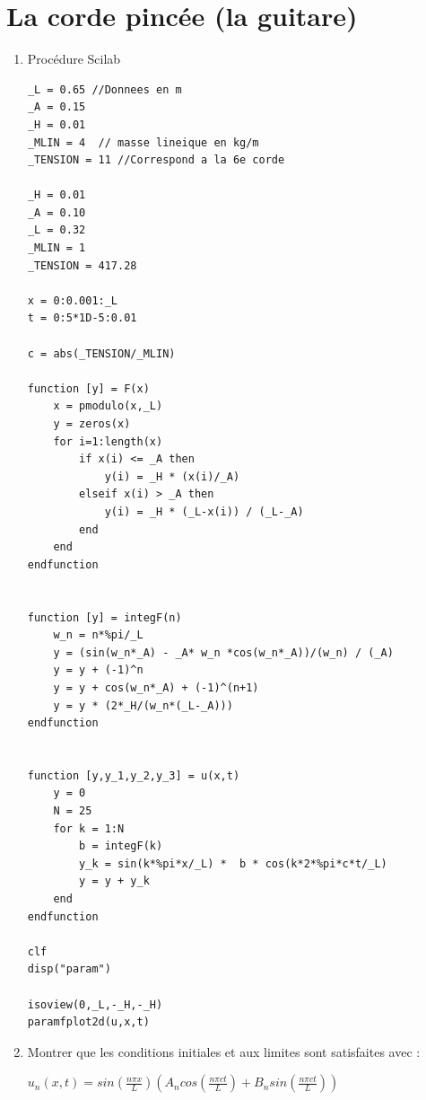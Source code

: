 \documentclass[a4paper,12pt]{report}
\begin{document}
\section{La corde pinc\'ee (la guitare)}
\begin{enumerate}
	\item Proc\'edure Scilab\\
	\begin{lstlisting}
_L = 0.65 //Donnees en m
_A = 0.15 
_H = 0.01
_MLIN = 4  // masse lineique en kg/m
_TENSION = 11 //Correspond a la 6e corde

_H = 0.01
_A = 0.10
_L = 0.32
_MLIN = 1
_TENSION = 417.28

x = 0:0.001:_L
t = 0:5*1D-5:0.01

c = abs(_TENSION/_MLIN)

function [y] = F(x)
    x = pmodulo(x,_L)
    y = zeros(x)
    for i=1:length(x)
        if x(i) <= _A then
            y(i) = _H * (x(i)/_A)
        elseif x(i) > _A then
            y(i) = _H * (_L-x(i)) / (_L-_A)
        end
    end  
endfunction


function [y] = integF(n)
    w_n = n*%pi/_L
    y = (sin(w_n*_A) - _A* w_n *cos(w_n*_A))/(w_n) / (_A) 
    y = y + (-1)^n
    y = y + cos(w_n*_A) + (-1)^(n+1)
    y = y * (2*_H/(w_n*(_L-_A))) 
endfunction


function [y,y_1,y_2,y_3] = u(x,t)  
    y = 0  
    N = 25
    for k = 1:N
        b = integF(k)
        y_k = sin(k*%pi*x/_L) *  b * cos(k*2*%pi*c*t/_L)
        y = y + y_k
    end
endfunction

clf
disp("param")

isoview(0,_L,-_H,-_H)
paramfplot2d(u,x,t)
	 \end{lstlisting}\newpage
	 
	\item Montrer que les conditions initiales et aux limites sont satisfaites avec :\\
	\begin{center}$u_n(x,t) = sin(\frac{n\pi x}{L}) (A_n cos(\frac{n\pi ct}{L}) + B_n sin(\frac{n\pi ct}{L}))$\end{center}
		

\end{enumerate}
\end{document}
